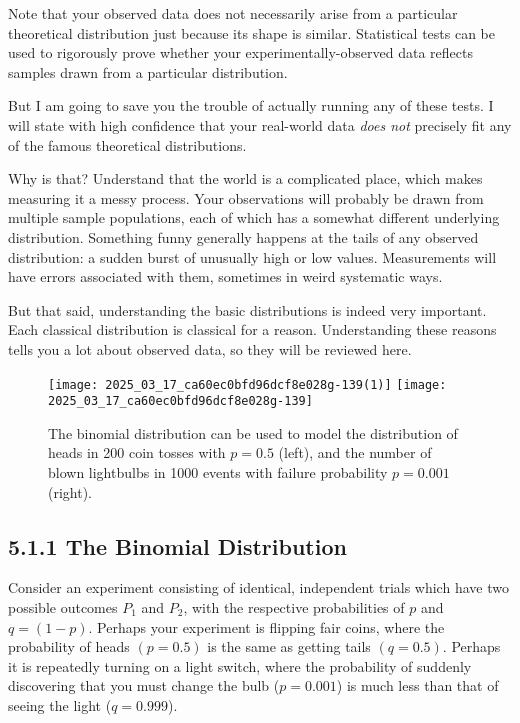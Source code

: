 \documentclass[10pt]{article}
\begin{document}
Note that your observed data does not necessarily arise from a particular theoretical distribution just because its shape is similar. Statistical tests can be used to rigorously prove whether your experimentally-observed data reflects samples drawn from a particular distribution.

But I am going to save you the trouble of actually running any of these tests. I will state with high confidence that your real-world data \emph{does not} precisely fit any of the famous theoretical distributions.

Why is that? Understand that the world is a complicated place, which makes measuring it a messy process. Your observations will probably be drawn from multiple sample populations, each of which has a somewhat different underlying distribution. Something funny generally happens at the tails of any observed distribution: a sudden burst of unusually high or low values. Measurements will have errors associated with them, sometimes in weird systematic ways.

But that said, understanding the basic distributions is indeed very important. Each classical distribution is classical for a reason. Understanding these reasons tells you a lot about observed data, so they will be reviewed here.

\begin{figure}[h]
\centering
\texttt{[image: 2025\_03\_17\_ca60ec0bfd96dcf8e028g-139(1)]}
\texttt{[image: 2025\_03\_17\_ca60ec0bfd96dcf8e028g-139]}
\caption{The binomial distribution can be used to model the distribution of heads in 200 coin tosses with $p=0.5$ (left), and the number of blown lightbulbs in 1000 events with failure probability $p=0.001$ (right).}
\end{figure}

\subsection*{5.1.1 The Binomial Distribution}
Consider an experiment consisting of identical, independent trials which have two possible outcomes $P_{1}$ and $P_{2}$, with the respective probabilities of $p$ and $q=(1-p)$. Perhaps your experiment is flipping fair coins, where the probability of heads $(p=0.5)$ is the same as getting tails $(q=0.5)$. Perhaps it is repeatedly turning on a light switch, where the probability of suddenly discovering that you must change the bulb ($p=0.001$) is much less than that of seeing the light ($q=0.999$).
\end{document}
